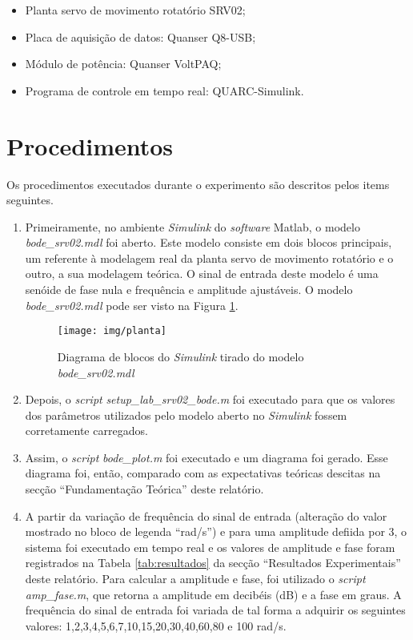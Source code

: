 \documentclass[a4paper,12pt]{article}
\begin{document}
\begin{itemize}
    \item Planta servo de movimento rotatório SRV02;
    \item Placa de aquisição de datos: Quanser Q8-USB;
    \item Módulo de potência: Quanser VoltPAQ;
    \item Programa de controle em tempo real: QUARC-Simulink.
\end{itemize}

\section{Procedimentos}
Os procedimentos executados durante o experimento são descritos pelos items seguintes.

\begin{enumerate}
\item Primeiramente, no ambiente \textit{Simulink} do \textit{software} Matlab, o modelo \textit{bode\_srv02.mdl} foi aberto. Este modelo consiste em dois blocos principais, um referente à modelagem real da planta servo de movimento rotatório e o outro, a sua modelagem teórica. O sinal de entrada deste modelo é uma senóide de fase nula e frequência e amplitude ajustáveis. O modelo \textit{bode\_srv02.mdl} pode ser visto na Figura \ref{fig:planta}.

\begin{figure}[H]
\centering
\texttt{[image: img/planta]}
\caption{Diagrama de blocos do \textit{Simulink} tirado do modelo \textit{bode\_srv02.mdl}}
\label{fig:planta}
\end{figure}

\item Depois, o \textit{script} \textit{setup\_lab\_srv02\_bode.m} foi executado para que os valores dos parâmetros utilizados pelo modelo aberto no \textit{Simulink} fossem corretamente carregados.

\item Assim, o \textit{script} \textit{bode\_plot.m} foi executado e um diagrama foi gerado. Esse diagrama foi, então, comparado com as expectativas teóricas descitas na secção ``Fundamentação Teórica'' deste relatório.

\item A partir da variação de frequência do sinal de entrada (alteração do valor mostrado no bloco de legenda ``rad/s'') e para uma amplitude defiida por 3, o sistema foi executado em tempo real e os valores de amplitude e fase foram registrados na Tabela \ref{tab:resultados} da secção ``Resultados Experimentais'' deste relatório. Para calcular a amplitude e fase, foi utilizado o \textit{script} \textit{amp\_fase.m}, que retorna a amplitude em decibéis (dB) e a fase em graus. A frequência do sinal de entrada foi variada de tal forma a adquirir os seguintes valores: 1,2,3,4,5,6,7,10,15,20,30,40,60,80 e 100 rad/s.


\end{enumerate}
\end{document}
